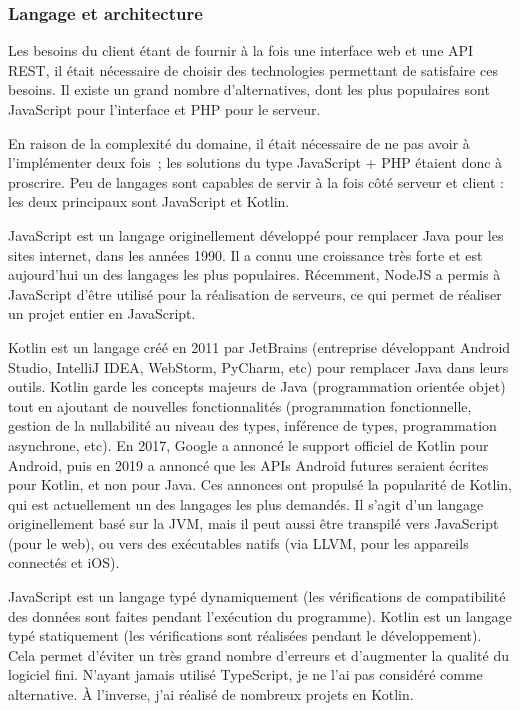\documentclass[11pt,french]{memoir}
\begin{document}
	\subsubsection{Langage et architecture}

	Les besoins du client étant de fournir à la fois une interface web et une API REST, il était nécessaire de choisir des technologies permettant de satisfaire ces besoins.
	Il existe un grand nombre d’alternatives, dont les plus populaires sont JavaScript pour l’interface et PHP pour le serveur.

	En raison de la complexité du domaine, il était nécessaire de ne pas avoir à l’implémenter deux fois~;
	les solutions du type JavaScript + PHP étaient donc à proscrire.
	Peu de langages sont capables de servir à la fois côté serveur et client : les deux principaux sont JavaScript et Kotlin.

	\uparagraph
	JavaScript est un langage originellement développé pour remplacer Java pour les sites internet, dans les années 1990.
	Il a connu une croissance très forte et est aujourd’hui un des langages les plus populaires.
	Récemment, NodeJS a permis à JavaScript d’être utilisé pour la réalisation de serveurs, ce qui permet de réaliser un projet entier en JavaScript.

	Kotlin est un langage créé en 2011 par JetBrains (entreprise développant Android Studio, IntelliJ IDEA, WebStorm, PyCharm, etc) pour remplacer Java dans leurs outils.
	Kotlin garde les concepts majeurs de Java (programmation orientée objet) tout en ajoutant de nouvelles fonctionnalités (programmation fonctionnelle, gestion de la nullabilité au niveau des types, inférence de types, programmation asynchrone, etc).
	En 2017, Google a annoncé le support officiel de Kotlin pour Android, puis en 2019 a annoncé que les APIs Android futures seraient écrites pour Kotlin, et non pour Java.
	Ces annonces ont propulsé la popularité de Kotlin, qui est actuellement un des langages les plus demandés.
	Il s’agit d’un langage originellement basé sur la JVM, mais il peut aussi être transpilé vers JavaScript (pour le web), ou vers des exécutables natifs (via LLVM, pour les appareils connectés et iOS).

	JavaScript est un langage typé dynamiquement (les vérifications de compatibilité des données sont faites pendant l’exécution du programme).
	Kotlin est un langage typé statiquement (les vérifications sont réalisées pendant le développement).
	Cela permet d’éviter un très grand nombre d’erreurs et d’augmenter la qualité du logiciel fini.
	N’ayant jamais utilisé TypeScript, je ne l’ai pas considéré comme alternative.
	À l'inverse, j'ai réalisé de nombreux projets en Kotlin.
\end{document}

